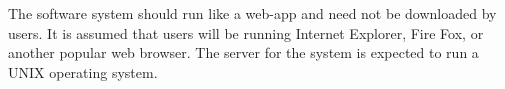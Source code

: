 		The software system should run like a web-app and need not be
		downloaded by users.  It is assumed that users will be running
		Internet Explorer, Fire Fox, or another popular web browser.
		The server for the system is expected to run a UNIX operating
		system.